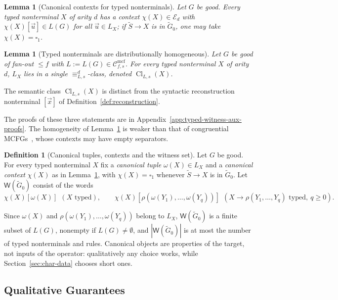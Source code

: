 \documentclass[11pt]{article}
\numberwithin{equation}{section}
\theoremstyle{plain}
\newtheorem{lemma}[theorem]{Lemma}
\theoremstyle{definition}
\newtheorem{definition}[theorem]{Definition}
\theoremstyle{remark}
\newcommand{\Wit}{\mathsf{W}}
\newcommand{\Cmcf}[2]{\mathcal{C}^{\mathrm{mcf}}_{#1,#2}}
\newcommand{\tuple}[1]{\vec{#1}}
\newcommand{\blank}{\square}
\theoremstyle{plain}
\begin{document}
\begin{lemma}[Canonical contexts for typed nonterminals]
\label{lem:identity-canonical-contexts}
Let $G$ be good.  Every typed nonterminal $X$ of arity $d$ has a context
$\chi(X)\in\mathcal E_d$ with $\chi(X)[\tuple u]\in L(G)$ for all
$\tuple u\in L_X$; if $\widetilde S\to X$ is in $\widetilde G_0$, one may take
$\chi(X)=\blank_1$.
\end{lemma}

\begin{lemma}[Typed nonterminals are distributionally homogeneous]
\label{lem:typed-homogeneity}
Let $G$ be good of fan-out $\le f$ with $L:=L(G)\in\Cmcf{f}{s}$.  For every typed nonterminal $X$
of arity $d$, $L_X$ lies in a single $\equiv_{L,s}^d$-class, denoted
$\operatorname{Cl}_{L,s}(X)$.
\end{lemma}

The semantic class $\operatorname{Cl}_{L,s}(X)$ is distinct from the syntactic
reconstruction nonterminal $[\tuple x]$ of Definition~\ref{def:reconstruction}.

The proofs of these three statements are in
Appendix~\ref{app:typed-witness-aux-proofs}.  The homogeneity of
Lemma~\ref{lem:typed-homogeneity} is weaker than that of congruential
MCFGs~\cite{ClarkYoshinaka2016}, whose contexts may have empty separators.

\begin{definition}[Canonical tuples, contexts and the witness set]
\label{def:target-canonical}
\label{def:witness-set}
Let $G$ be good.  For every typed nonterminal $X$ fix a \emph{canonical tuple}
$\omega(X)\in L_X$ and a \emph{canonical context} $\chi(X)$ as in
Lemma~\ref{lem:identity-canonical-contexts}, with $\chi(X)=\blank_1$ whenever
$\widetilde S\to X$ is in $\widetilde G_0$.  Let $\Wit(\widetilde G_0)$
consist of the words
\[
 \chi(X)[\omega(X)]\ \ (X\text{ typed}),\qquad
 \chi(X)[\rho(\omega(Y_1),\ldots,\omega(Y_q))]\ \
 (X\to\rho(Y_1,\ldots,Y_q)\text{ typed},\ q\ge0).
\]
\end{definition}

Since $\omega(X)$ and $\rho(\omega(Y_1),\ldots,\omega(Y_q))$ belong to $L_X$,
$\Wit(\widetilde G_0)$ is a finite subset of $L(G)$, nonempty if
$L(G)\ne\emptyset$, and $|\Wit(\widetilde G_0)|$ is at most the number of
typed nonterminals and rules.  Canonical objects are properties of the
target, not inputs of the operator: qualitatively any choice works, while
Section~\ref{sec:char-data} chooses short ones.

\subsection{Qualitative Guarantees}
\label{sec:completeness}
\label{sec:poly-time}
\end{document}

